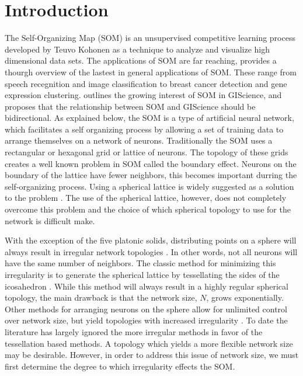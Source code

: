 \documentclass[10pt,titlepage]{article}
\begin{document}
\section{Introduction}
The Self-Organizing Map (SOM) is an unsupervised competitive learning process
developed by Teuvo Kohonen as a technique to analyze and visualize high
dimensional data sets.  The applications of SOM are far reaching,
\cite{Kohonen2000} provides a thourgh overview of the lastest in general
applications of SOM.  These range from speech recegnition and image
classification to breast cancer detection and gene expression clustering.
\cite{skupin06} outlines the growing interest of SOM in GIScience, and
proposes that the relationship between SOM and GIScience should be bidirectional.  
As explained below, the SOM is a type of artificial neural network, which
facilitates a self organizing process by allowing a set of training data to
arrange themselves on a network of neurons.  Traditionally the SOM uses a
rectangular or hexagonal grid or lattice of neurons. The topology of these
grids creates a well known problem in SOM called the boundary effect.  Neurons
on the boundary of the lattice have fewer neighbors, this becomes important
durring the self-organizing process.  Using a spherical lattice is widely suggested as a
solution to the problem \citep{ritter99, boudjemai2003, sangole03, wu2006,
Nishio:2006fk}.  The use of the spherical lattice, however, does not
completely overcome this problem and the choice of which spherical topology to
use for the network is difficult make.

With the exception of the five platonic solids, distributing points on
a sphere will always result in irregular network topologies \citep{ritter99,
harris2000}.  In other words, not all neurons will have the same number of
neighbors.  The classic method for minimizing this irregularity is to generate
the spherical lattice by tessellating the sides of the icosahedron
\citep{Nishio:2006fk}.  While this method will always result in a highly regular
spherical topology, the main drawback is that the network size, \(N\), grows
exponentially. Other methods for arranging neurons on the sphere allow for
unlimited control over network size, but yield topologies with increased
irregularity \citep{harris2000, wu2005, Nishio:2006fk}.  To date the literature
has largely ignored the more irregular methods in favor of the tessellation based
methods.  A topology which yields a more flexible network size may be desirable.
However, in order to address this issue of network size, we must first determine
the degree to which irregularity effects the SOM.
\end{document}
